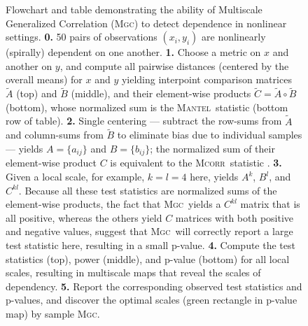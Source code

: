 \documentclass[11pt]{article}
\providecommand{\sct}[1]{{\normalfont\textsc{#1}}}
\newcommand{\Mgc}{\sct{Mgc}}
\newcommand{\Mcorr}{\sct{Mcorr}}
\newcommand{\Mantel}{\sct{Mantel}}
\begin{document}
\begin{figure}[htbp]
\caption{
Flowchart  and table demonstrating the ability of Multiscale Generalized Correlation (\Mgc) to detect dependence in nonlinear settings. 
%
%
%
\textbf{0.} 50 pairs of observations $(x_i,y_i)$ are nonlinearly (spirally) dependent on one another.
% 
\textbf{1.} Choose a metric on $x$ and another on $y$, and compute all pairwise distances (centered by the overall means) for $x$ and $y$ yielding interpoint comparison matrices
 $\tilde{A}$ (top) and $\tilde{B}$ (middle), 
and their element-wise products $\tilde{C}=\tilde{A} \circ \tilde{B}$ (bottom), whose normalized sum is the  \Mantel~statistic \cite{Mantel1967} (bottom row of table).
% 
\textbf{2.} Single centering --- subtract the row-sums from $\tilde{A}$ and column-sums from $\tilde{B}$ to eliminate bias due to individual samples --- yields $A=\{a_{ij}\}$ and $B=\{b_{ij}\}$; the normalized sum of their  element-wise product  $C$ is equivalent to the  \Mcorr~statistic \cite{SzekelyRizzo2013a}.
% 
\textbf{3.} Given a local scale, for example, $k=l=4$ here, yields $A^{k}$, $B^{l}$, and $C^{kl}$.  Because all these test statistics are normalized sums of the element-wise products, the fact that \Mgc~yields a $C^{kl}$ matrix that is all positive, whereas the others yield $C$ matrices with both positive and negative values, suggest that \Mgc~will correctly report a large test statistic here, resulting in a small p-value.
\textbf{4.} Compute the test statistics (top), power (middle), and p-value (bottom) for all local scales, resulting in multiscale maps that reveal the  scales of dependency. 
\textbf{5.} Report the corresponding observed test statistics and p-values, and discover the optimal scales (green rectangle in  p-value map) by sample \Mgc.  
}
\end{figure}
\end{document}
